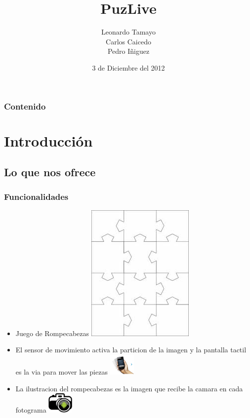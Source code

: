 \documentclass[serif,11pt]{beamer}
\begin{document}
	\title {PuzLive}  
	\author {Leonardo Tamayo\\ Carlos Caicedo \\ Pedro I\~niguez}
	\date[Octubre, 2012]{3 de Diciembre del 2012\\}
	

	\begin{frame}
		\titlepage
	\end{frame}

	\begin{frame}
		\frametitle{Contenido}\tableofcontents
	\end{frame} 


	\section{Introducci\'on} 

		\subsection{Lo que nos ofrece}

			\begin{frame}\frametitle{Funcionalidades}
				\pause
				\bigskip
				 
				\begin{itemize}
					 \bigskip
					\item Juego de Rompecabezas 
					\pause
					\includegraphics[height=0.1\textwidth]{rompeca} 
					\bigskip
					\pause
					
					\item El sensor de movimiento activa la particion de la imagen y la pantalla tactil es la via para mover las piezas 
					\pause
					\includegraphics[width=0.1\textwidth]{shake} 
					\bigskip
					\pause
					\item La ilustracion del rompecabezas es la imagen que recibe la camara en cada fotograma
					\bigskip
					\pause
					\includegraphics[width=0.1\textwidth]{camara1} 
					\bigskip

				\end{itemize}
			\end{frame}
\end{document}
